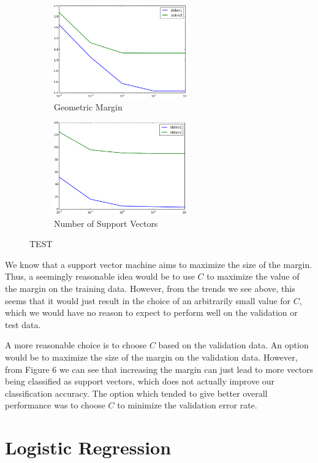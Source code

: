 \documentclass{sigchi}
\begin{document}
\begin{figure}
\centering

\begin{subfigure}[b]{2.25in}
	\includegraphics[width = 2.25in]{plots/1-3/margin.png}
	\caption{Geometric Margin}
\end{subfigure}

\begin{subfigure}[b]{2.25in}
	\includegraphics[width = 2.25in]{plots/1-3/support_vectors.png}
	\caption{Number of Support Vectors}
\end{subfigure}
\caption{TEST}
\end{figure}

We know that a support vector machine aims to maximize the size of the margin. Thus, a seemingly reasonable idea would be to use $C$ to maximize the value of the margin on the training data. However, from the trends we see above, this seems that it would just result in the choice of an arbitrarily small value for $C$, which we would have no reason to expect to perform well on the validation or test data.

A more reasonable choice is to choose $C$ based on the validation data. An option would be to maximize the size of the margin on the validation data. However, from Figure 6 we can see that increasing the margin can just lead to more vectors being classified as support vectors, which does not actually improve our classification accuracy. The option which tended to give better overall performance was to choose $C$ to minimize the validation error rate.


\section{Logistic Regression}
\end{document}
